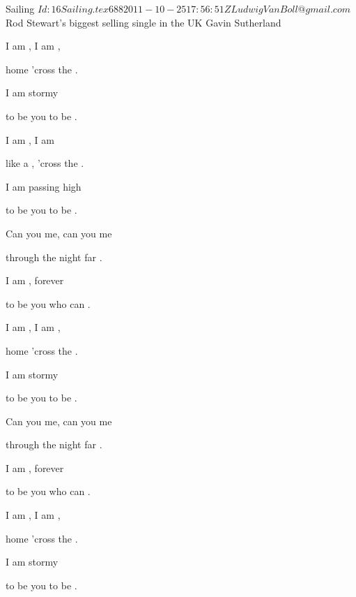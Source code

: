 \begin{SBSong}{Sailing}
  {$Id: 16Sailing.tex 688 2011-10-25 17:56:51Z LudwigVanBoll@gmail.com $}
  {Rod Stewart's biggest selling single in the UK}
  {Gavin Sutherland}
  \begin{SBVerse}
    I am , I am ,

    home  'cross the .

    I am  stormy 

    to be  you to be . 
  \end{SBVerse}
  \begin{SBVerse}
    I am , I am 

    like a , 'cross the .

    I am  passing high 

    to be  you to be . 
  \end{SBVerse}
  \begin{SBVerse}
    Can you  me, can you  me 

    through the  night far .

    I am , forever 

    to be  you who can . 
  \end{SBVerse}
  \begin{SBVerse}
    I am , I am ,

    home  'cross the .

    I am  stormy 

    to be  you to be . 
  \end{SBVerse}
  \begin{SBVerse}
    Can you  me, can you  me 

    through the  night far .

    I am , forever 

    to be  you who can . 
  \end{SBVerse}
  \begin{SBVerse}
    I am , I am ,

    home  'cross the .

    I am  stormy 

    to be  you to be . 
  \end{SBVerse}
\end{SBSong}